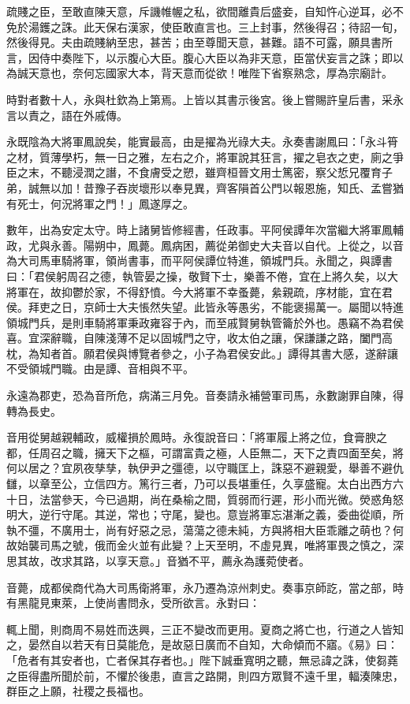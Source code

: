 \begin{pinyinscope}
疏賤之臣，至敢直陳天意，斥譏帷幄之私，欲間離貴后盛妾，自知忤心逆耳，必不免於湯鑊之誅。此天保右漢家，使臣敢直言也。三上封事，然後得召；待詔一旬，然後得見。夫由疏賤納至忠，甚苦；由至尊聞天意，甚難。語不可露，願具書所言，因侍中奏陛下，以示腹心大臣。腹心大臣以為非天意，臣當伏妄言之誅；即以為誠天意也，奈何忘國家大本，背天意而從欲！唯陛下省察熟念，厚為宗廟計。

時對者數十人，永與杜欽為上第焉。上皆以其書示後宮。後上嘗賜許皇后書，采永言以責之，語在外戚傳。

永既陰為大將軍鳳說矣，能實最高，由是擢為光祿大夫。永奏書謝鳳曰：「永斗筲之材，質薄學朽，無一日之雅，左右之介，將軍說其狂言，擢之皂衣之吏，廁之爭臣之末，不聽浸潤之譖，不食膚受之愬，雖齊桓晉文用士篤密，察父悊兄覆育子弟，誠無以加！昔豫子吞炭壞形以奉見異，齊客隕首公門以報恩施，知氏、孟嘗猶有死士，何況將軍之門！」鳳遂厚之。

數年，出為安定太守。時上諸舅皆修經書，任政事。平阿侯譚年次當繼大將軍鳳輔政，尤與永善。陽朔中，鳳薨。鳳病困，薦從弟御史大夫音以自代。上從之，以音為大司馬車騎將軍，領尚書事，而平阿侯譚位特進，領城門兵。永聞之，與譚書曰：「君侯躬周召之德，執管晏之操，敬賢下士，樂善不倦，宜在上將久矣，以大將軍在，故抑鬱於家，不得舒憤。今大將軍不幸蚤薨，絫親疏，序材能，宜在君侯。拜吏之日，京師士大夫悵然失望。此皆永等愚劣，不能褒揚萬一。屬聞以特進領城門兵，是則車騎將軍秉政雍容于內，而至戚賢舅執管籥於外也。愚竊不為君侯喜。宜深辭職，自陳淺薄不足以固城門之守，收太伯之讓，保謙謙之路，闔門高枕，為知者首。願君侯與博覽者參之，小子為君侯安此。」譚得其書大感，遂辭讓不受領城門職。由是譚、音相與不平。

永遠為郡吏，恐為音所危，病滿三月免。音奏請永補營軍司馬，永數謝罪自陳，得轉為長史。

音用從舅越親輔政，威權損於鳳時。永復說音曰：「將軍履上將之位，食膏腴之都，任周召之職，擁天下之樞，可謂富貴之極，人臣無二，天下之責四面至矣，將何以居之？宜夙夜孳孳，執伊尹之彊德，以守職匡上，誅惡不避親愛，舉善不避仇讎，以章至公，立信四方。篤行三者，乃可以長堪重任，久享盛寵。太白出西方六十日，法當參天，今已過期，尚在桑榆之間，質弱而行遲，形小而光微。熒惑角怒明大，逆行守尾。其逆，常也；守尾，變也。意豈將軍忘湛漸之義，委曲從順，所執不彊，不廣用士，尚有好惡之忌，蕩蕩之德未純，方與將相大臣乖離之萌也？何故始襲司馬之號，俄而金火並有此變？上天至明，不虛見異，唯將軍畏之慎之，深思其故，改求其路，以享天意。」音猶不平，薦永為護菀使者。

音薨，成都侯商代為大司馬衛將軍，永乃遷為涼州刺史。奏事京師訖，當之部，時有黑龍見東萊，上使尚書問永，受所欲言。永對曰：

輒上聞，則商周不易姓而迭興，三正不變改而更用。夏商之將亡也，行道之人皆知之，晏然自以若天有日莫能危，是故惡日廣而不自知，大命傾而不寤。《易》曰：「危者有其安者也，亡者保其存者也。」陛下誠垂寬明之聽，無忌諱之誅，使芻蕘之臣得盡所聞於前，不懼於後患，直言之路開，則四方眾賢不遠千里，輻湊陳忠，群臣之上願，社稷之長福也。


\end{pinyinscope}

